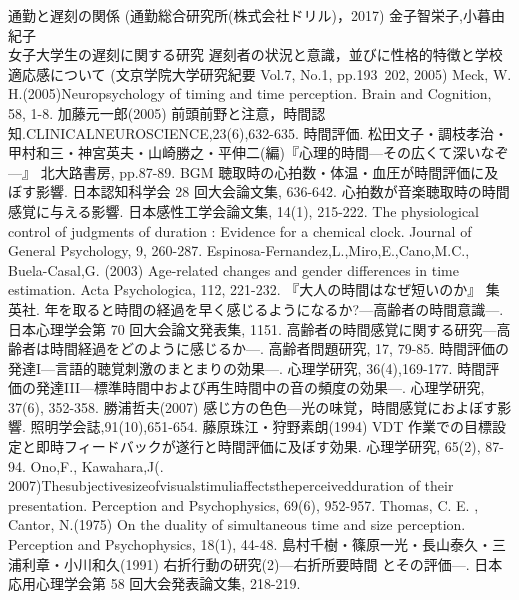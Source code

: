 \begin{thebibliography}{100}

通勤と遅刻の関係 (通勤総合研究所(株式会社ドリル)，2017)
金子智栄子,小暮由紀子\\
女子大学生の遅刻に関する研究 遅刻者の状況と意識，並びに性格的特徴と学校適応感について (文京学院大学研究紀要 Vol.7, No.1, pp.193~202, 2005)
Meck, W. H.(2005)Neuropsychology of timing and time perception. Brain and Cognition, 58, 1-8.
加藤元一郎(2005) 前頭前野と注意，時間認知.CLINICALNEUROSCIENCE,23(6),632-635.
時間評価. 松田文子・調枝孝治・甲村和三・神宮英夫・山崎勝之・平伸二(編)『心理的時間—その広くて深いなぞ—』 北大路書房, pp.87-89.
BGM 聴取時の心拍数・体温・血圧が時間評価に及ぼす影響. 日本認知科学会 28 回大会論文集, 636-642.
心拍数が音楽聴取時の時間感覚に与える影響. 日本感性工学会論文集, 14(1), 215-222.
The physiological control of judgments of duration : Evidence for a chemical clock. Journal of General Psychology, 9, 260-287.
Espinosa-Fernandez,L.,Miro,E.,Cano,M.C., Buela-Casal,G. (2003) Age-related changes and gender differences in time estimation. Acta Psychologica, 112, 221-232.
『大人の時間はなぜ短いのか』 集英社.
年を取ると時間の経過を早く感じるようになるか?—高齢者の時間意識—. 日本心理学会第 70 回大会論文発表集, 1151.
高齢者の時間感覚に関する研究—高齢者は時間経過をどのように感じるか—. 高齢者問題研究, 17, 79-85.
時間評価の発達I—言語的聴覚刺激のまとまりの効果—. 心理学研究, 36(4),169-177.
時間評価の発達III—標準時間中および再生時間中の音の頻度の効果—. 心理学研究, 37(6), 352-358.
勝浦哲夫(2007) 感じ方の色色—光の味覚，時間感覚におよぼす影響. 照明学会誌,91(10),651-654.
藤原珠江・狩野素朗(1994) VDT 作業での目標設定と即時フィードバックが遂行と時間評価に及ぼす効果. 心理学研究, 65(2), 87-94.
Ono,F., Kawahara,J(. 2007)Thesubjectivesizeofvisualstimuliaffectstheperceivedduration of their presentation. Perception and Psychophysics, 69(6), 952-957.
Thomas, C. E. ,  Cantor, N.(1975) On the duality of simultaneous time and size perception. Perception and Psychophysics, 18(1), 44-48.
島村千樹・篠原一光・長山泰久・三浦利章・小川和久(1991) 右折行動の研究(2)—右折所要時間 とその評価—. 日本応用心理学会第 58 回大会発表論文集, 218-219.

\end{thebibliography}
